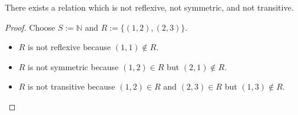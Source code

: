 \documentclass[12pt]{article}
\newcommand{\N}{\mathbb{N}}
\newenvironment{ex}[2][Problem]{\begin{trivlist}
\item[\hskip \labelsep {\bfseries #1}\hskip \labelsep {\bfseries #2.}]}{\end{trivlist}}
\begin{document}
\begin{ex}{12} [-R-S-T]
    There exists a relation which is not reflexive, not symmetric, and not transitive.
\end{ex}

\begin{proof}
    Choose $S:=\N$ and $R:=\{(1, 2),(2, 3)\}$.
    \begin{itemize}
        \item $R$ is not reflexive because $(1, 1)\notin R$.
        \item $R$ is not symmetric because $(1, 2)\in R$ but $(2, 1)\notin R$.
        \item $R$ is not transitive because
            $(1, 2)\in R$ and $(2, 3)\in R$ but $(1, 3)\notin R$.
    \end{itemize}
\end{proof}
\end{document}
